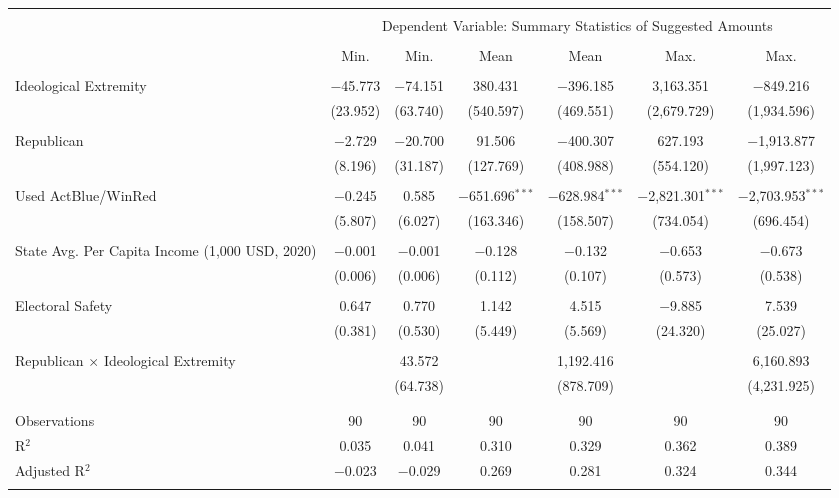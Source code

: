 
\begin{tabular}{@{\extracolsep{5pt}}lcccccc} 
\\[-1.8ex]\hline 
\hline \\[-1.8ex] 
 & \multicolumn{6}{c}{Dependent Variable: Summary Statistics of Suggested Amounts} \\ 
\cline{2-7} 
\\[-1.8ex] & Min. & Min. & Mean & Mean & Max. & Max. \\ 
\hline \\[-1.8ex] 
 Ideological Extremity & $-$45.773 & $-$74.151 & 380.431 & $-$396.185 & 3,163.351 & $-$849.216 \\ 
  & (23.952) & (63.740) & (540.597) & (469.551) & (2,679.729) & (1,934.596) \\ 
  & & & & & & \\ 
 Republican & $-$2.729 & $-$20.700 & 91.506 & $-$400.307 & 627.193 & $-$1,913.877 \\ 
  & (8.196) & (31.187) & (127.769) & (408.988) & (554.120) & (1,997.123) \\ 
  & & & & & & \\ 
 Used ActBlue/WinRed & $-$0.245 & 0.585 & $-$651.696$^{***}$ & $-$628.984$^{***}$ & $-$2,821.301$^{***}$ & $-$2,703.953$^{***}$ \\ 
  & (5.807) & (6.027) & (163.346) & (158.507) & (734.054) & (696.454) \\ 
  & & & & & & \\ 
 State Avg. Per Capita Income (1,000 USD, 2020) & $-$0.001 & $-$0.001 & $-$0.128 & $-$0.132 & $-$0.653 & $-$0.673 \\ 
  & (0.006) & (0.006) & (0.112) & (0.107) & (0.573) & (0.538) \\ 
  & & & & & & \\ 
 Electoral Safety & 0.647 & 0.770 & 1.142 & 4.515 & $-$9.885 & 7.539 \\ 
  & (0.381) & (0.530) & (5.449) & (5.569) & (24.320) & (25.027) \\ 
  & & & & & & \\ 
 Republican $\times$ Ideological Extremity &  & 43.572 &  & 1,192.416 &  & 6,160.893 \\ 
  &  & (64.738) &  & (878.709) &  & (4,231.925) \\ 
  & & & & & & \\ 
\hline \\[-1.8ex] 
Observations & 90 & 90 & 90 & 90 & 90 & 90 \\ 
R$^{2}$ & 0.035 & 0.041 & 0.310 & 0.329 & 0.362 & 0.389 \\ 
Adjusted R$^{2}$ & $-$0.023 & $-$0.029 & 0.269 & 0.281 & 0.324 & 0.344 \\ 
\hline 
\hline \\[-1.8ex] 
\end{tabular} 
